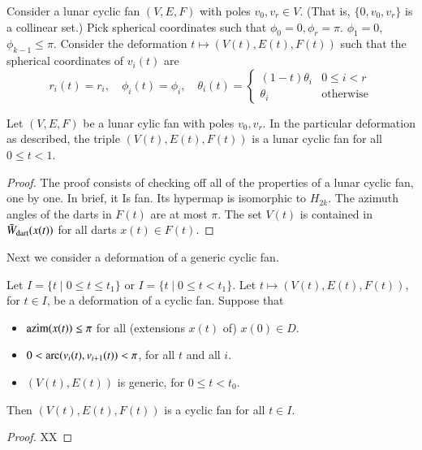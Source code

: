 {{Consider a lunar cyclic fan $(V,E,F)$ with poles $v_0,v_r\in V$.  (That is, $\{0,v_0,v_r\}$ is a collinear set.)   Pick spherical coordinates such that $\phi_0=0,\phi_r=\pi$.  $\phi_1=0$, $\phi_{k-1}\le\pi$.  Consider the deformation $t\mapsto (V(t),E(t),F(t))$ such that the spherical coordinates of $v_i(t)$ are
$$
r_i(t)=r_i,\quad \phi_i(t)=\phi_i,\quad \theta_i(t) =
\begin{cases} 
   (1-t) \theta_i & 0\le i< r\\ 
   \theta_i & \text{otherwise}
\end{cases}
$$

\begin{lemma} Let $(V,E,F)$ be a lunar cylic fan with poles $v_0,v_r$.  In the particular deformation as described, the triple $(V(t),E(t),F(t))$ is a lunar cyclic fan for all $0\le t< 1$.
\end{lemma}

\begin{proof}  The proof consists of checking off all of the properties of a lunar cyclic fan, one by one.  In brief, it Is fan.  Its hypermap is isomorphic to $H_{2k}$.  The azimuth angles of the darts in $F(t)$ are at most $\pi$.  The set $V(t)$ is contained in $\bar W_{\text{dart}}(x(t))$ for all darts $x(t)\in F(t)$.
\end{proof}

Next we consider a deformation of a generic cyclic fan.



\begin{lemma} Let $I = \{t\mid 0\le t\le t_1\}$ or $I=\{t\mid 0\le t < t_1\}$.  Let $t\mapsto (V(t),E(t),F(t))$, for $t\in I$, be a deformation of a cyclic fan.  Suppose that 
\begin{itemize} 
\item ${\operatorname{azim}}(x(t))\le \pi$ for all (extensions $x(t)$ of) $x(0)\in D$.
\item $0 < \operatorname{arc}(v_i(t),v_{i+1}(t)) < \pi$, for all $t$ and all $i$.
\item $(V(t),E(t))$ is generic, for $0\le t<t_0$.
\end{itemize}
Then $(V(t),E(t),F(t))$ is a cyclic fan for all $t\in I$.
\end{lemma}

\begin{proof}
XX
\end{proof}

}}

